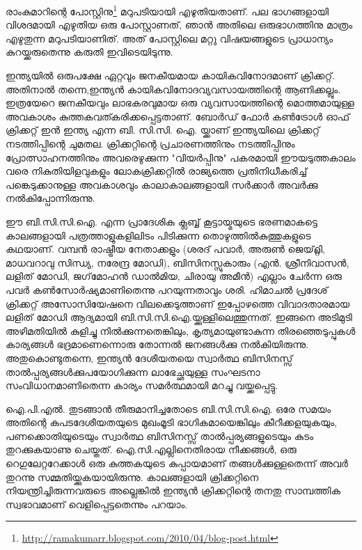 \vskip 2pt


രാംകുമാറിന്റെ പോസ്റ്റിനു\footnote{\url{http://ramakumarr.blogspot.com/2010/04/blog-post.html}} മറുപടിയായി എഴുതിയതാണ്. പല ഭാഗങ്ങളായി വിശദമായി എഴുതിയ ഒരു പോസ്റ്റാണത്, ഞാന്‍ അതിലെ ഒരുഭാഗത്തിനു മാത്രം എഴുതുന്ന മറുപടിയാണിത്. അത് പോസ്റ്റിലെ മറ്റു വിഷയങ്ങളുടെ പ്രാധാന്യം കുറയ്ക്കരുതെന്നു കരുതി ഇവിടെയിടുന്നു.

ഇന്ത്യയില്‍ ഒരുപക്ഷേ ഏറ്റവും ജനകീയമായ കായികവിനോദമാണ് ക്രിക്കറ്റ്. അതിനാല്‍ തന്നെ,ഇന്ത്യന്‍ കായികവിനോദവ്യവസായത്തിന്റെ ആണിക്കല്ലും. ഇത്രയേറെ ജനകീയവും ലാഭകരവുമായ ഒരു വ്യവസായത്തിന്റെ മൊത്തമായുള്ള അവകാശം കുത്തകവത്കരിക്കപ്പെട്ടതാണ്. ബോര്‍ഡ് ഫോര്‍ കണ്‍ട്രോള്‍ ഓഫ് ക്രിക്കറ്റ് ഇന്‍ ഇന്ത്യ എന്ന ബി. സി.സി. ഐ. യ്ക്കാണ് ഇന്ത്യയിലെ ക്രിക്കറ്റ് നടത്തിപ്പിന്റെ ചുമതല. ക്രിക്കറ്റിന്റെ പ്രചാരണത്തിനും നടത്തിപ്പിനും പ്രോത്സാഹനത്തിനും അവരെഴുക്കുന്ന "വിയര്‍പ്പിനു" പകരമായി ഈയടുത്തകാലം വരെ നികുതിയിളവുകളും ലോകക്രിക്കറ്റില്‍ രാജ്യത്തെ പ്രതിനിധീകരിച്ച് പങ്കെടുക്കാനുള്ള അവകാശവും കാലാകാലങ്ങളായി സര്‍ക്കാര്‍ അവര്‍ക്കു നല്‍കിപ്പോന്നിരുന്നു.

ഈ ബി.സി.സി.ഐ. എന്ന പ്രാദേശിക ക്ലബ്ബ് കൂട്ടായ്മയുടെ ഭരണമാകട്ടെ കാലങ്ങളായി പത്രത്താളുകളിലിടം പിടിക്കുന്ന തൊഴുത്തില്‍കുത്തുകളുടെ കഥയാണ്. വമ്പന്‍ രാഷ്ട്രീയ നേതാക്കളും (ശരദ് പവാര്‍, അരുണ്‍ ജെയ്റ്റ്ലി, മാധവറാവു സിന്ധ്യ, നരേന്ദ്ര മോഡി), ബിസിനസ്സുകാരും (എന്‍. ശ്രീനിവാസന്‍, ലളിത് മോഡി, ജഗ്‌മോഹന്‍ ഡാല്‍മിയ, ചിരായു അമീന്‍) എല്ലാം ചേര്‍ന്ന ഒരു പവര്‍ കണ്‍സോര്‍ഷ്യമാണിതെന്നു പറയുന്നതാവും ശരി. ഹിമാചല്‍ പ്രദേശ് ക്രിക്കറ്റ് അസോസിയേഷനെ വിലക്കെടുത്താണ് ഇപ്പോഴത്തെ വിവാദതാരമായ ലളിത് മോഡി ആദ്യമായി ബി.സി.സി.ഐ.യ്ക്കുള്ളിലെത്തുന്നത്. ഇങ്ങനെ അടിമുടി അഴിമതിയില്‍ കുളിച്ചു നില്‍ക്കുന്നതെങ്കിലും, കൃത്യമായുണ്ടാകുന്ന തിരഞ്ഞെടുപ്പുകള്‍ കാര്യങ്ങള്‍ ഭദ്രമാണെന്നൊരു തോന്നല്‍ ജനങ്ങള്‍ക്കു നല്‍കിയിരുന്നു. അതുകൊണ്ടുതന്നെ, ഇന്ത്യന്‍ ദേശീയതയെ സ്വാര്‍ത്ഥ ബിസിനസ്സ് താല്‍പ്പര്യങ്ങള്‍ക്കുപയോഗിക്കുന്ന ലാഭേച്ഛയുള്ള സംഘടനാ സംവിധാനമാണിതെന്ന കാര്യം സമര്‍ത്ഥമായി മറച്ചു വയ്ക്കപ്പെട്ടു.

ഐ.പി.എല്‍. തുടങ്ങാന്‍ തീരുമാനിച്ചതോടെ ബി.സി.സി.ഐ. ഒരേ സമയം അതിന്റെ കപടദേശീയതയുടെ മുഖംമൂടി ഭാഗികമായെങ്കിലും കീറീക്കളയുകയും, പണക്കൊതിയുടെയും സ്വാര്‍ത്ഥ ബിസിനസ്സ് താല്‍പ്പര്യങ്ങളുടെയും കുടം തുറക്കുകയാണു ചെയ്തത്. ഐ.സി.എല്ലിനെതിരായ നീക്കങ്ങള്‍, ഒരു റെഗുലേറ്ററേക്കാള്‍ ഒരു കുത്തകയുടെ കുപ്പായമാണ് തങ്ങള്‍ക്കുള്ളതെന്ന് അവര്‍ തുറന്നു സമ്മതിയ്ക്കുകയായിരുന്നു. കാലങ്ങളായി ക്രിക്കറ്റിനെ നിയന്ത്രിച്ചിരുന്നവരുടെ അല്ലെങ്കില്‍ ഇന്ത്യന്‍ ക്രിക്കറ്റിന്റെ തനതു സാമ്പത്തിക സ്വഭാവമാണ് വെളിപ്പെട്ടതെന്നും പറയാം.

